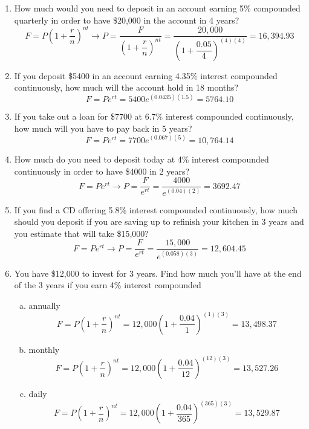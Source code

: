 \begin{enumerate}
\item How much would you need to deposit in an account earning 5\% compounded quarterly in order to have \$20,000 in the account in 4 years? 
\[F = P\left(1 + \dfrac{r}{n}\right)^{nt} \longrightarrow P = \dfrac{F}{\left(1 + \dfrac{r}{n}\right)^{nt}} = \dfrac{20,000}{\left(1 + \dfrac{0.05}{4}\right)^{(4)(4)}} = 16,394.93\]

\item If you deposit \$5400 in an account earning 4.35\% interest compounded continuously, how much will the account hold in 18 months? 
\[F = Pe^{rt} = 5400e^{(0.0435)(1.5)} = 5764.10\]

\item If you take out a loan for \$7700 at 6.7\% interest compounded continuously, how much will you have to pay back in 5 years? 
\[F = Pe^{rt} = 7700e^{(0.067)(5)} = 10,764.14\]

\item How much do you need to deposit today at 4\% interest compounded continuously in order to have \$4000 in 2 years? 
\[F = Pe^{rt} \longrightarrow P = \dfrac{F}{e^{rt}} = \dfrac{4000}{e^{(0.04)(2)}} = 3692.47\]

\item If you find a CD offering 5.8\% interest compounded continuously, how much should you deposit if you are saving up to refinish your kitchen in 3 years and you estimate that will take \$15,000? 
\[F = Pe^{rt} \longrightarrow P = \dfrac{F}{e^{rt}} = \dfrac{15,000}{e^{(0.058)(3)}} = 12,604.45\]
\pagebreak

\item You have \$12,000 to invest for 3 years.  Find how much you'll have at the end of the 3 years if you earn 4\% interest compounded
\begin{enumerate}[(a)]
\item annually 
\[F = P\left(1 + \dfrac{r}{n}\right)^{nt} = 12,000\left(1 + \dfrac{0.04}{1}\right)^{(1)(3)} = 13,498.37\]

\item monthly 
\[F = P\left(1 + \dfrac{r}{n}\right)^{nt} = 12,000\left(1 + \dfrac{0.04}{12}\right)^{(12)(3)} = 13,527.26\]

\item daily 
\[F = P\left(1 + \dfrac{r}{n}\right)^{nt} = 12,000\left(1 + \dfrac{0.04}{365}\right)^{(365)(3)} = 13,529.87\]


\end{enumerate}
\end{enumerate}
